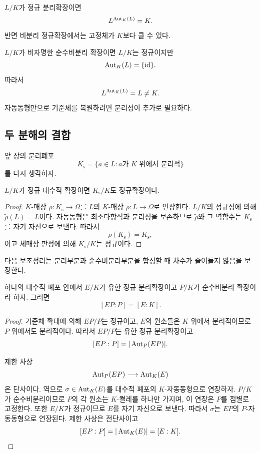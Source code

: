 \begin{corollary}
$L/K$가 정규 분리확장이면
\[
  L^{\operatorname{Aut}_K(L)}=K.
\]
반면 비분리 정규확장에서는 고정체가 $K$보다 클 수 있다.
\end{corollary}

\begin{example}
$L/K$가 비자명한 순수비분리 확장이면 $L/K$는 정규이지만
\[
  \operatorname{Aut}_K(L)=\{\operatorname{id}\}.
\]
따라서
\[
  L^{\operatorname{Aut}_K(L)}=L\ne K.
\]
자동동형만으로 기준체를 복원하려면 분리성이 추가로 필요하다.
\end{example}

\subsection{두 분해의 결합}

앞 장의 분리폐포
\[
  K_{\mathrm s}=\{a\in L:a\text{가 }K\text{ 위에서 분리적}\}
\]
를 다시 생각하자.

\begin{proposition}
$L/K$가 정규 대수적 확장이면 $K_{\mathrm s}/K$도 정규확장이다.
\end{proposition}

\begin{proof}
$K$-매장 $\rho:K_{\mathrm s}\to\Omega$를 $L$의 $K$-매장 $\widetilde\rho:L\to\Omega$로 연장한다. $L/K$의 정규성에 의해 $\widetilde\rho(L)=L$이다. 자동동형은 최소다항식과 분리성을 보존하므로 $\widetilde\rho$와 그 역함수는 $K_{\mathrm s}$를 자기 자신으로 보낸다. 따라서
\[
  \rho(K_{\mathrm s})=K_{\mathrm s},
\]
이고 체매장 판정에 의해 $K_{\mathrm s}/K$는 정규이다.
\end{proof}

다음 보조정리는 분리부분과 순수비분리부분을 합성할 때 차수가 줄어들지 않음을 보장한다.

\begin{lemma}
하나의 대수적 폐포 안에서 $E/K$가 유한 정규 분리확장이고 $P/K$가 순수비분리 확장이라 하자. 그러면
\[
  [EP:P]=[E:K].
\]
\end{lemma}

\begin{proof}
기준체 확대에 의해 $EP/P$는 정규이고, $E$의 원소들은 $K$ 위에서 분리적이므로 $P$ 위에서도 분리적이다. 따라서 $EP/P$는 유한 정규 분리확장이고
\[
  [EP:P]=|\operatorname{Aut}_P(EP)|.
\]

제한 사상
\[
  \operatorname{Aut}_P(EP)\longrightarrow\operatorname{Aut}_K(E)
\]
은 단사이다. 역으로 $\sigma\in\operatorname{Aut}_K(E)$를 대수적 폐포의 $K$-자동동형으로 연장하자. $P/K$가 순수비분리이므로 $P$의 각 원소는 $K$-켤레를 하나만 가지며, 이 연장은 $P$를 점별로 고정한다. 또한 $E/K$가 정규이므로 $E$를 자기 자신으로 보낸다. 따라서 $\sigma$는 $EP$의 $P$-자동동형으로 연장된다. 제한 사상은 전단사이고
\[
  [EP:P]=|\operatorname{Aut}_K(E)|=[E:K].
\]
\end{proof}

